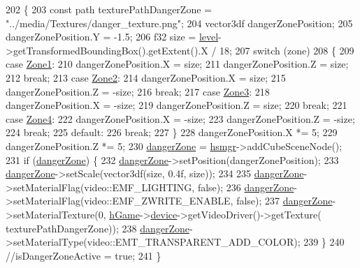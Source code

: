 \begin{DoxyCode}
202 \{
203     \textcolor{keyword}{const} path texturePathDangerZone = \textcolor{stringliteral}{"../media/Textures/danger\_texture.png"};
204     vector3df dangerZonePosition;
205     dangerZonePosition.Y = -1.5;
206     f32 size = \hyperlink{class_heat_map_manager_a63ca12aefa554bf0756608865f1e1909}{level}->getTransformedBoundingBox().getExtent().X / 18;
207     \textcolor{keywordflow}{switch} (zone)
208     \{
209     \textcolor{keywordflow}{case} \hyperlink{class_heat_map_manager_a6d43bc39106e6d2e72437f8902a586b6ac12fb3749b1e4eb1e472927e11bfd45b}{Zone1}:
210         dangerZonePosition.X = size;
211         dangerZonePosition.Z = size;
212         \textcolor{keywordflow}{break};
213     \textcolor{keywordflow}{case} \hyperlink{class_heat_map_manager_a6d43bc39106e6d2e72437f8902a586b6a3e20dce2afa7429facffa3cc1b41fcc3}{Zone2}:
214         dangerZonePosition.X = size;
215         dangerZonePosition.Z = -size;
216         \textcolor{keywordflow}{break};
217     \textcolor{keywordflow}{case} \hyperlink{class_heat_map_manager_a6d43bc39106e6d2e72437f8902a586b6a400a98ad8579431fad61d4325b5c9694}{Zone3}:
218         dangerZonePosition.X = -size;
219         dangerZonePosition.Z = size;
220         \textcolor{keywordflow}{break};
221     \textcolor{keywordflow}{case} \hyperlink{class_heat_map_manager_a6d43bc39106e6d2e72437f8902a586b6a39c3884e0f29b1453a01317ffc283a85}{Zone4}:
222         dangerZonePosition.X = -size;
223         dangerZonePosition.Z = -size;
224         \textcolor{keywordflow}{break};
225     \textcolor{keywordflow}{default}:
226         \textcolor{keywordflow}{break};
227     \}
228     dangerZonePosition.X *= 5;
229     dangerZonePosition.Z *= 5;
230     \hyperlink{class_heat_map_manager_ad5ca224ccce646f0c6fdfce6d48d1c13}{dangerZone} = \hyperlink{_heat_map_manager_8cpp_afce8176d06e37bb8d8bf11f5947b4181}{hsmgr}->addCubeSceneNode();
231     \textcolor{keywordflow}{if} (\hyperlink{class_heat_map_manager_ad5ca224ccce646f0c6fdfce6d48d1c13}{dangerZone}) \{
232         \hyperlink{class_heat_map_manager_ad5ca224ccce646f0c6fdfce6d48d1c13}{dangerZone}->setPosition(dangerZonePosition);
233         \hyperlink{class_heat_map_manager_ad5ca224ccce646f0c6fdfce6d48d1c13}{dangerZone}->setScale(vector3df(size, 0.4f, size));
234 
235         \hyperlink{class_heat_map_manager_ad5ca224ccce646f0c6fdfce6d48d1c13}{dangerZone}->setMaterialFlag(video::EMF\_LIGHTING, \textcolor{keyword}{false});
236         \hyperlink{class_heat_map_manager_ad5ca224ccce646f0c6fdfce6d48d1c13}{dangerZone}->setMaterialFlag(video::EMF\_ZWRITE\_ENABLE, \textcolor{keyword}{false});
237         \hyperlink{class_heat_map_manager_ad5ca224ccce646f0c6fdfce6d48d1c13}{dangerZone}->setMaterialTexture(0, \hyperlink{_heat_map_manager_8cpp_ac34ec415c121b1595d2b5d4b545ae96b}{hGame}->\hyperlink{class_game_a4968552e2ba3037d494596a908eccc00}{device}->getVideoDriver()->getTexture(
      texturePathDangerZone));
238         \hyperlink{class_heat_map_manager_ad5ca224ccce646f0c6fdfce6d48d1c13}{dangerZone}->setMaterialType(video::EMT\_TRANSPARENT\_ADD\_COLOR);
239     \}
240     \textcolor{comment}{//isDangerZoneActive = true;}
241 \}
\end{DoxyCode}
